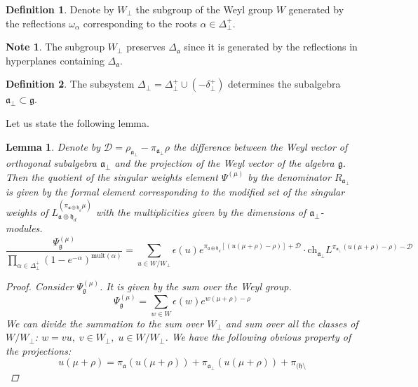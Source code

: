 \documentclass[a4paper,12pt]{article}
\newtheorem{lemma}{Lemma}
\theoremstyle{definition}
\theoremstyle{definition}
\newtheorem{mynote}{Note}[section]
\theoremstyle{definition}
\newtheorem{definition}{Definition}
\newcommand{\pia}{\pi_{\mathfrak{a}}}
\newcommand{\piab}{\pi_{\mathfrak{a}_{\bot}}}
\newcommand{\af}{\mathfrak{a}}
\begin{document}
\begin{definition}
  Denote by $W_{\bot}$ the subgroup of the Weyl group $W$ generated by the reflections $\omega_{\alpha}$ corresponding to the roots $\alpha\in \Delta^{+}_{\bot}$.
\end{definition}
\begin{mynote}
  The subgroup $W_{\bot}$ preserves $\Delta_{\af}$ since it is generated by the reflections in hyperplanes containing $\Delta_{\af}$.
\end{mynote}
\begin{definition}
  The subsystem $\Delta_{\bot}=\Delta^{+}_{\bot}\cup \left(-\delta^{+}_{\bot}\right)$ determines the subalgebra $\af_{\bot}\subset \mathfrak{g}$.
\end{definition}

Let us state the following lemma.
\begin{lemma}
Denote by $\mathcal{D}=\rho_{\af_{\bot}}-\pi_{\mathfrak{a}_{\bot}}\rho$ the difference between the Weyl vector of orthogonal subalgebra $\af_{\bot}$ and the projection of the Weyl vector of the algebra $\mathfrak{g}$. Then
the quotient of the singular weights element $\Psi^{(\mu)}$ by the denominator $R_{\af_{\bot}}$ is given by the formal element corresponding to the modified set of the singular weights of $L_{\af\oplus\mathfrak{h}_d}^{(\pi_{\af\oplus\mathfrak{h}_d}\mu)}$ with the multiplicities given by the dimensions of $\af_{\bot}$-modules.
\begin{equation}
  \label{eq:4}
  \frac{\Psi^{(\mu)}_{\mathfrak{g}}}{\prod_{\alpha\in \Delta^{+}_{\bot}}\left(1-e^{-\alpha}\right)^{\mathrm{mult}(\alpha)}}=
    \sum_{u\in W/W_{\bot}}\epsilon(u)e^{\pi_{\af\oplus\mathfrak{h}_d}\left[(u(\mu+\rho)-\rho)\right]+\mathcal{D}}\cdot \mathrm{ch}_{\af_{\bot}}
      L^{\piab(u(\mu+\rho)-\rho)-\mathcal{D}}
\end{equation}
\begin{proof}
  Consider $\Psi^{(\mu)}_{\mathfrak{g}}$. It is given by the sum over the Weyl group.
  \begin{equation}
    \label{eq:6}
    \Psi^{(\mu)}_{\mathfrak{g}}=\sum_{w\in W}\epsilon(w)e^{w(\mu+\rho)-\rho}
  \end{equation}
  We can divide the summation to the sum over $W_{\bot}$ and sum over all the classes of $W/W_{\bot}$: $w=vu,\; v\in W_{\bot},\; u \in W/W_{\bot}$. We have the following obvious property of the projections:
  \begin{equation}
    \label{eq:5}
    u(\mu+\rho)=\pia(u(\mu+\rho))+\piab(u(\mu+\rho))+\pi_{(\mathfrak{h}\setminus
}
\end{equation}
\end{proof}
\end{lemma}
\end{document}
